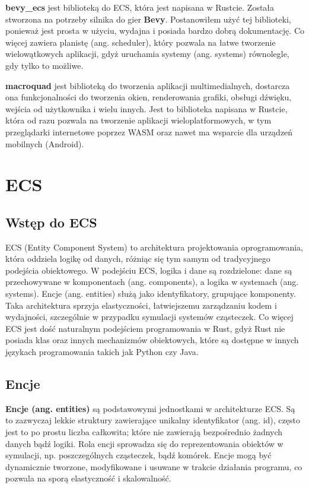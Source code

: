 \documentclass[11pt]{article}
\begin{document}
\textbf{bevy\_ecs} jest biblioteką do ECS, która jest napisana w Rustcie. Została stworzona na potrzeby silnika do gier \textbf{Bevy}.
Postanowiłem użyć tej biblioteki, ponieważ jest prosta w użyciu, wydajna i posiada bardzo dobrą dokumentację. Co więcej zawiera
planistę (ang. scheduler), który pozwala na łatwe tworzenie wielowątkowych aplikacji, gdyż uruchamia systemy (ang. systems) równolegle,
gdy tylko to możliwe.

\textbf{macroquad} jest biblioteką do tworzenia aplikacji multimedialnych, dostarcza ona funkcjonalności do tworzenia okien,
renderowania grafiki, obsługi dźwięku, wejścia od użytkownika i wielu innych. Jest to biblioteka napisana w Rustcie, która
od razu pozwala na tworzenie aplikacji wieloplatformowych, w tym przeglądarki internetowe poprzez WASM oraz nawet ma wsparcie
dla urządzeń mobilnych (Android).

\section{ECS}
\subsection{Wstęp do ECS}
ECS (Entity Component System) to architektura projektowania oprogramowania, która oddziela logikę od danych,
różniąc się tym samym od tradycyjnego podejścia obiektowego. W podejściu ECS, logika i dane są rozdzielone:
dane są przechowywane w komponentach (ang. components), a logika w systemach (ang. systems). Encje (ang. entities)
służą jako identyfikatory, grupujące komponenty. Taka architektura sprzyja elastyczności, łatwiejszemu zarządzaniu kodem
i wydajności, szczególnie w przypadku symulacji systemów cząsteczek. Co więcej ECS jest dość naturalnym podejściem
programowania w Rust, gdyż Rust nie posiada klas oraz innych mechanizmów obiektowych, które są dostępne w innych językach
programowania takich jak Python czy Java.

\subsection{Encje}
\textbf{Encje (ang. entities)} są podstawowymi jednostkami w architekturze ECS. Są to zazwyczaj lekkie struktury zawierające
unikalny identyfikator (ang. id), często jest to po prostu liczba całkowita; które nie zawierają bezpośrednio żadnych danych
bądź logiki. Rola encji sprowadza się do reprezentowania obiektów w symulacji, np. poszczególnych cząsteczek, bądź komórek.
Encje mogą być dynamicznie tworzone, modyfikowane i usuwane w trakcie działania programu, co pozwala na sporą
elastyczność i skalowalność.
\end{document}

